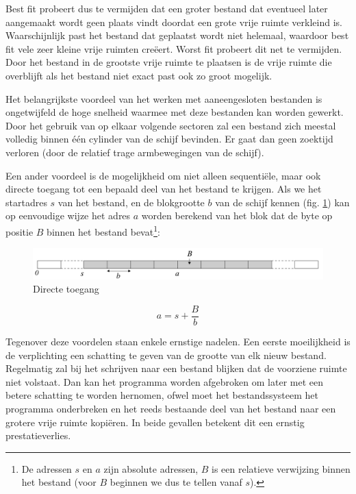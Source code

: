 Best fit probeert dus te vermijden dat een groter bestand dat
eventueel later aangemaakt wordt geen plaats vindt doordat een grote
vrije ruimte verkleind is. Waarschijnlijk past het bestand dat geplaatst
wordt niet helemaal, waardoor best fit vele zeer kleine vrije ruimten
cre\"eert. Worst fit probeert dit net te vermijden. Door het bestand in de
grootste vrije ruimte te plaatsen is de vrije ruimte die overblijft als
het bestand niet exact past ook zo groot mogelijk.

Het belangrijkste voordeel van het werken met aaneengesloten
bestanden is ongetwijfeld de hoge snelheid waarmee met deze bestanden
kan worden gewerkt. Door het gebruik van op elkaar volgende sectoren zal
een bestand zich meestal volledig binnen \'e\'en cylinder van de schijf
bevinden. Er gaat dan geen zoektijd verloren (door de relatief trage
armbewegingen van de schijf).

Een ander voordeel is de mogelijkheid om niet alleen sequenti\"ele,
maar ook directe toegang tot een bepaald deel van het bestand te
krijgen. Als we het startadres $s$ van het bestand, en de blokgrootte $b$
van de schijf kennen (fig. \ref{direct}) kan op eenvoudige wijze het adres $a$ worden berekend
van het blok dat de byte op positie $B$ binnen het bestand bevat\footnote{De
adressen $s$ en $a$ zijn absolute adressen, $B$ is een relatieve verwijzing
binnen het
bestand (voor $B$ beginnen we dus te tellen vanaf $s$).}:

\begin{figure}
\begin{center}
\includegraphics[width=\textwidth]{images/fig0407.png}
\end{center}
\caption{Directe toegang}
\label{direct}
\end{figure}

\begin{displaymath}
a = s + \frac{B}{b}
\end{displaymath}

Tegenover deze voordelen staan enkele ernstige nadelen. Een eerste
moeilijkheid is de verplichting een schatting te geven van de grootte
van elk nieuw bestand. Regelmatig zal bij het schrijven naar een bestand
blijken dat de voorziene ruimte niet volstaat. Dan kan het programma
worden afgebroken om later met een betere schatting te worden hernomen,
ofwel moet het bestandssysteem het programma onderbreken en het reeds
bestaande deel van het bestand naar een grotere vrije ruimte kopi\"eren.
In beide gevallen betekent dit een ernstig prestatieverlies.

